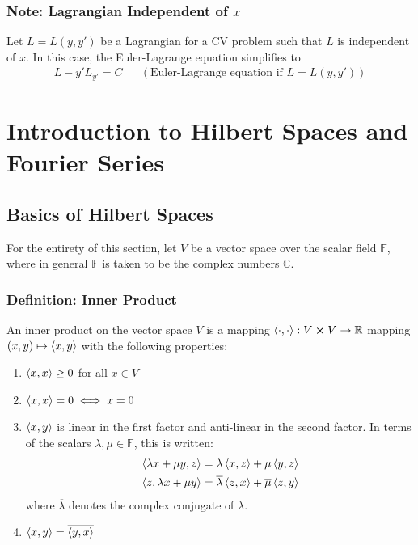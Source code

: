 \documentclass[11pt, a4paper]{article}
\newcommand{\R}{\mathbb{R}} %
\newcommand{\F}{\mathbb{F}} %
\begin{document}
\subsubsection{Note: Lagrangian Independent of $ x $}
Let $ L = L(y, y') $ be a Lagrangian for a CV problem such that $ L $ is independent of $ x $. In this case, the Euler-Lagrange equation simplifies to
\begin{align*}
	L - y' L_{y'} = C && (\text{Euler-Lagrange equation if } L = L(y, y'))
\end{align*}


\newpage
		
\section{Introduction to Hilbert Spaces and Fourier Series}

\subsection{Basics of Hilbert Spaces}
For the entirety of this section, let $ V $ be a vector space over the scalar field $ \F $, where in general $ \F $ is taken to be the complex numbers $ \mathbb{C} $.


\subsubsection{Definition: Inner Product}
An inner product on the vector space $ V $ is a mapping $ \expval{\cdot, \cdot}: V \cross V \to \R $ mapping $ (x, y) \mapsto \expval{x, y} $ with the following properties:
\begin{enumerate}
	\item $ \expval{x, x} \geq 0 $ for all $ x \in V $
	\item $ \expval{x, x} = 0 \iff x = 0$
	\item $ \expval{x, y} $ is linear in the first factor and anti-linear in the second factor. In terms of the scalars $ \lambda, \mu \in \F $, this is written:
	\begin{align*}
		&\expval{\lambda x + \mu y, z} = \lambda \expval{x, z} + \mu \expval{y, z}\\
		&\expval{z, \lambda x + \mu y} =  \overline{\lambda} \expval{z, x} + \overline{\mu} \expval{z, y}
	\end{align*}
	where $ \overline{\lambda} $ denotes the complex conjugate of $ \lambda $.
	\item $ \expval{x, y} = \overline{\expval{y, x}}$
\end{enumerate}
\end{document}
